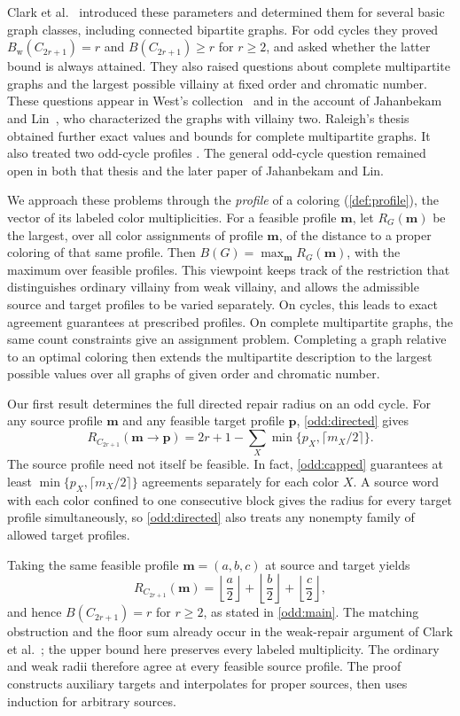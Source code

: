 \documentclass[11pt,reqno]{amsart}
\numberwithin{equation}{section}
\theoremstyle{definition}
\theoremstyle{remark}
\begin{document}
Clark et al.~\cite{clark2006} introduced these parameters and determined
them for several basic graph classes, including connected bipartite
graphs. For odd cycles they proved
$B_{\mathrm w}(C_{2r+1})=r$ and $B(C_{2r+1})\ge r$ for $r\ge2$,
and asked whether the latter bound is always attained. They also raised
questions about complete multipartite graphs and the largest possible
villainy at fixed order and chromatic number. These questions appear in
West's collection~\cite{west2006} and in the account of Jahanbekam and
Lin~\cite{jahanbekam2021}, who characterized the graphs with villainy
two. Raleigh's thesis~\cite{raleigh2018} obtained further exact values
and bounds for complete multipartite graphs. It also treated two odd-cycle profiles
\cite[Theorems~7 and~8]{raleigh2018}.
The general odd-cycle question remained open in both that thesis and
the later paper of Jahanbekam and Lin.

We approach these problems through the \emph{profile} of a coloring (\cref{def:profile}),
the vector of its labeled color multiplicities. For a feasible profile
$\mathbf m$, let $R_G(\mathbf m)$ be the largest, over all color assignments of
profile $\mathbf m$, of the distance to a proper coloring of that same
profile. Then $B(G)=\max_{\mathbf m}R_G(\mathbf m)$, with the maximum
over feasible profiles. This viewpoint keeps track of the restriction
that distinguishes ordinary villainy from weak villainy, and allows
the admissible source and target profiles to be varied separately.
On cycles, this leads to exact agreement guarantees at prescribed
profiles. On complete multipartite graphs, the same count constraints
give an assignment problem. Completing a graph relative to an optimal
coloring then extends the multipartite description to the largest
possible values over all graphs of given order and chromatic number.

Our first result determines the full directed repair radius on an odd
cycle. For any source profile $\mathbf m$ and any feasible target
profile $\mathbf p$, \cref{odd:directed} gives
\[
 R_{C_{2r+1}}(\mathbf m\to\mathbf p)
 =2r+1-\sum_X\min\{p_X,\lceil m_X/2\rceil\}.
\]
The source profile need not itself be feasible. In fact,
\cref{odd:capped} guarantees at least
$\min\{p_X,\lceil m_X/2\rceil\}$ agreements separately for each
color $X$. A source word with each color confined to one consecutive
block gives the radius for every
target profile simultaneously, so \cref{odd:directed} also treats any
nonempty family of allowed target profiles.

Taking the same feasible profile $\mathbf m=(a,b,c)$ at source and
target yields
\[
 R_{C_{2r+1}}(\mathbf m)
 =\left\lfloor\frac a2\right\rfloor
  +\left\lfloor\frac b2\right\rfloor
  +\left\lfloor\frac c2\right\rfloor,
\]
and hence $B(C_{2r+1})=r$ for $r\ge2$, as stated in
\cref{odd:main}. The matching obstruction and the floor sum already
occur in the weak-repair argument of
Clark et al.~\cite[Proposition~3.5]{clark2006}; the upper bound here
preserves every labeled multiplicity. The ordinary and weak radii
therefore agree at every feasible source profile. The proof constructs
auxiliary targets and interpolates for proper sources, then uses
induction for arbitrary sources.
\end{document}
